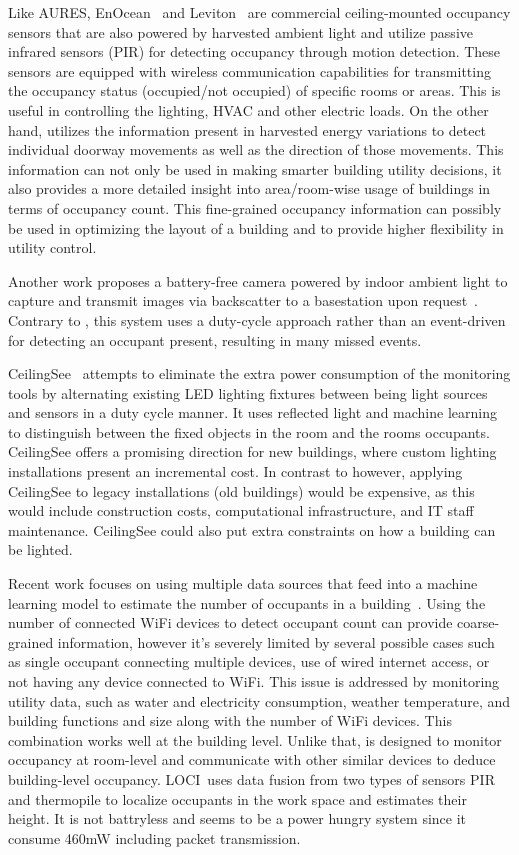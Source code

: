 Like AURES, EnOcean~\cite{EnOcean} and Leviton~\cite{Leviton} are commercial ceiling-mounted occupancy sensors that are also powered by harvested ambient light and utilize passive infrared sensors (PIR) for detecting occupancy through motion detection. These sensors are equipped with wireless communication capabilities for transmitting the occupancy status (occupied/not occupied) of specific rooms or areas. This is useful in controlling the lighting, HVAC and other electric loads. On the other hand, \sysname utilizes the information present in harvested energy variations to detect individual doorway movements as well as the direction of those movements. This information can not only be used in making smarter building utility decisions, it also provides a more detailed insight into area/room-wise usage of buildings in terms of occupancy count. This fine-grained occupancy information can possibly be used in optimizing the layout of a building and to provide higher flexibility in utility control.

Another work proposes a battery-free camera powered by indoor ambient light to capture and transmit images via backscatter to a basestation upon request~\cite{saffari2021battery}. Contrary to \sysname, this system uses a duty-cycle approach rather than an event-driven for detecting an occupant present, resulting in many missed events.

CeilingSee~\cite{yang2017ceilingsee} attempts to eliminate the extra power consumption of the monitoring tools by alternating existing LED lighting fixtures between being light sources and sensors in a duty cycle manner.
It uses reflected light and machine learning to distinguish between the fixed objects in the room and the rooms occupants.
CeilingSee offers a promising direction for new buildings, where custom lighting installations present an incremental cost. 
In contrast to \sysname however, applying CeilingSee to legacy installations (old buildings) would be expensive, as this would include construction costs, computational infrastructure, and IT staff maintenance.
CeilingSee could also put extra constraints on how a building can be lighted.

Recent work focuses on using multiple data sources that feed into a machine learning model to estimate the number of occupants in a building~\cite{das2017non}. Using the number of connected WiFi devices to detect occupant count can provide coarse-grained information, however it's severely limited by several possible cases such as single occupant connecting multiple devices, use of wired internet access, or not having any device connected to WiFi. This issue is addressed by monitoring utility data, such as water and electricity consumption, weather temperature, and building functions and size along with the number of WiFi devices. This combination works well at the building level. Unlike that, \sysname is designed to monitor occupancy at room-level and communicate with other similar devices to deduce building-level occupancy. 
LOCI~\cite{narayanaloci}uses data fusion from two types of sensors PIR and thermopile to localize occupants in the work space and estimates their height. It is not battryless and seems to be a power hungry system since it consume 460mW including packet transmission. 


